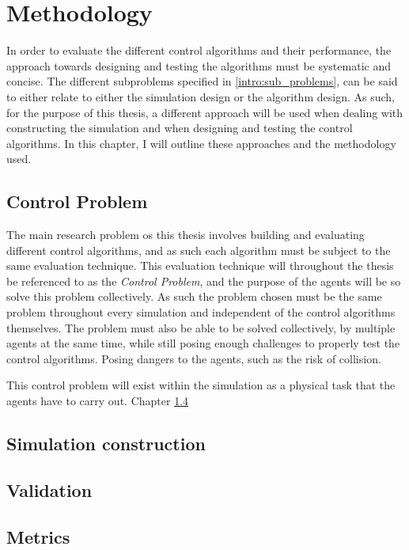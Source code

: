 
\chapter{Methodology}

In order to evaluate the different control algorithms and their performance, the approach towards designing and testing the algorithms must be systematic and concise. 
The different subproblems specified in \ref{intro:sub_problems}, can be said to either relate to either the simulation design or the algorithm design. As such, for the purpose of this thesis, a different approach will be used when dealing with constructing the simulation and when designing and testing the control algorithms. In this chapter, I will outline these approaches and the methodology used. 

\section{Control Problem}
The main research problem os this thesis involves building and evaluating different control algorithms, and as such each algorithm must be subject to the same evaluation technique.
This evaluation technique will throughout the thesis be referenced to as the \textit{Control Problem}, and the purpose of the agents will be so solve this problem collectively. 
As such the problem chosen must be the same problem throughout every simulation and independent of the control algorithms themselves. The problem must also be able to be solved collectively, by multiple agents at the same time, while still posing enough challenges to properly test the control algorithms. Posing dangers to the agents, such as the risk of collision. 

This control problem will exist within the simulation as a physical task that the agents have to carry out. Chapter \ref{}


\section{Simulation construction}

\section{Validation}

\section{Metrics}


